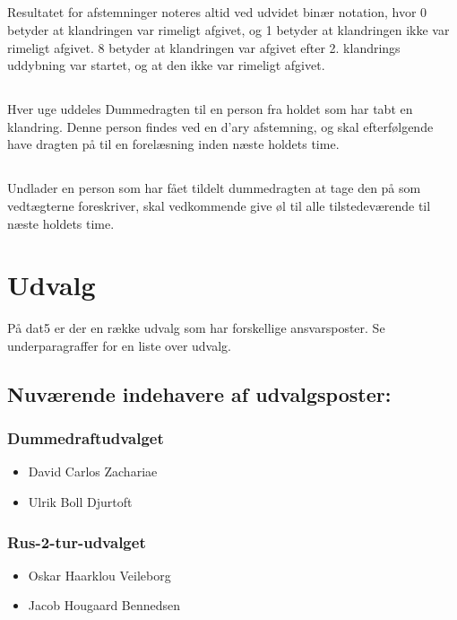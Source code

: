 \documentclass{article}
\begin{document}
	\subsection{}
	Resultatet for afstemninger noteres altid ved udvidet binær notation, hvor 0 betyder at klandringen var rimeligt afgivet, og 1 betyder at klandringen ikke var rimeligt afgivet. 8 betyder at klandringen var afgivet efter 2. klandrings uddybning var startet, og at den ikke var rimeligt afgivet.
	\subsection{}
	Hver uge uddeles Dummedragten til en person fra holdet som har tabt en klandring. Denne person findes ved en d'ary afstemning, og skal efterfølgende have dragten på til en forelæsning inden næste holdets time.
	\subsection{}
	Undlader en person som har fået tildelt dummedragten at tage den på som vedtægterne foreskriver, skal vedkommende give øl til alle tilstedeværende til næste holdets time.
	
	\section{Udvalg}
	På dat5 er der en række udvalg som har forskellige ansvarsposter. Se underparagraffer for en liste over udvalg.
	\subsection{Nuværende indehavere af udvalgsposter:}
	\subsubsection{Dummedraftudvalget}
	\begin{itemize}
		\item David Carlos Zachariae
		\item Ulrik Boll Djurtoft
	\end{itemize}
	\subsubsection{Rus-2-tur-udvalget}
	\begin{itemize}
		\item Oskar Haarklou Veileborg
		\item Jacob Hougaard Bennedsen
	\end{itemize}
\end{document}

